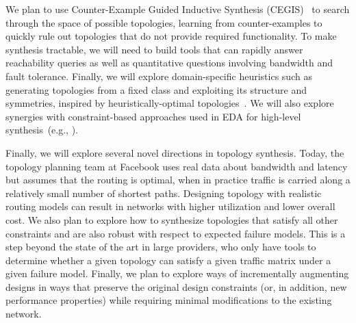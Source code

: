 
We plan to use Counter-Example Guided Inductive Synthesis
(CEGIS)~\cite{sketch} to search through the space of possible
topologies, learning from counter-examples to quickly rule out
topologies that do not provide required functionality. To make
synthesis tractable, we will need to build tools that can rapidly
answer reachability queries as well as quantitative questions
involving bandwidth and fault tolerance. Finally, we will explore
domain-specific heuristics such as generating topologies from a fixed
class and exploiting its structure and symmetries, inspired by
heuristically-optimal topologies~\cite{HOT}.  We will also explore
synergies with constraint-based approaches used in EDA for high-level
synthesis~(e.g., \cite{cong}).

\iffalse
Finally, we will explore several novel directions in topology
synthesis. Today, the topology planning team at Facebook uses real
data about bandwidth and latency but assumes that the routing is
optimal, when in practice traffic is carried along a relatively small
number of shortest paths. Designing topology with realistic routing
models can result in networks with higher utilization and lower
overall cost.  We also plan to explore how to synthesize topologies
that satisfy all other constraints and are also robust with respect to
expected failure models. This is a step beyond the state of the art in
large providers, who only have tools to determine whether a given
topology can satisfy a given traffic matrix under a given failure
model. Finally, we plan to
explore ways of incrementally augmenting designs in ways that preserve
the original design constraints (or, in addition, new performance
properties) while requiring minimal modifications to the existing
network.


